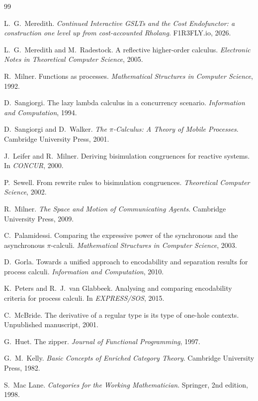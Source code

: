 \documentclass[11pt,a4paper]{article}
\theoremstyle{definition}
\theoremstyle{plain}
\theoremstyle{remark}
\begin{document}
\begin{thebibliography}{99}

L.\ G.\ Meredith.
\newblock \emph{Continued Interactive GSLTs and the Cost Endofunctor: a construction
one level up from cost-accounted Rholang}.
\newblock F1R3FLY.io, 2026.

L.\ G.\ Meredith and M.\ Radestock.
\newblock A reflective higher-order calculus.
\newblock \emph{Electronic Notes in Theoretical Computer Science}, 2005.

R.\ Milner.
\newblock Functions as processes.
\newblock \emph{Mathematical Structures in Computer Science}, 1992.

D.\ Sangiorgi.
\newblock The lazy lambda calculus in a concurrency scenario.
\newblock \emph{Information and Computation}, 1994.

D.\ Sangiorgi and D.\ Walker.
\newblock \emph{The $\pi$-Calculus: A Theory of Mobile Processes}.
\newblock Cambridge University Press, 2001.

J.\ Leifer and R.\ Milner.
\newblock Deriving bisimulation congruences for reactive systems.
\newblock In \emph{CONCUR}, 2000.

P.\ Sewell.
\newblock From rewrite rules to bisimulation congruences.
\newblock \emph{Theoretical Computer Science}, 2002.

R.\ Milner.
\newblock \emph{The Space and Motion of Communicating Agents}.
\newblock Cambridge University Press, 2009.

C.\ Palamidessi.
\newblock Comparing the expressive power of the synchronous and the asynchronous
$\pi$-calculi.
\newblock \emph{Mathematical Structures in Computer Science}, 2003.

D.\ Gorla.
\newblock Towards a unified approach to encodability and separation results for
process calculi.
\newblock \emph{Information and Computation}, 2010.

K.\ Peters and R.\ J.\ van Glabbeek.
\newblock Analysing and comparing encodability criteria for process calculi.
\newblock In \emph{EXPRESS/SOS}, 2015.

C.\ McBride.
\newblock The derivative of a regular type is its type of one-hole contexts.
\newblock Unpublished manuscript, 2001.

G.\ Huet.
\newblock The zipper.
\newblock \emph{Journal of Functional Programming}, 1997.

G.\ M.\ Kelly.
\newblock \emph{Basic Concepts of Enriched Category Theory}.
\newblock Cambridge University Press, 1982.

S.\ Mac Lane.
\newblock \emph{Categories for the Working Mathematician}.
\newblock Springer, 2nd edition, 1998.

\end{thebibliography}
\end{document}
